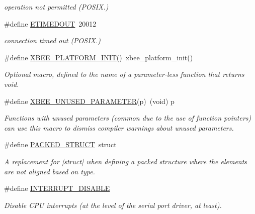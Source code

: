 \begin{DoxyCompactItemize}
\begin{DoxyCompactList}\small\item\em operation not permitted (P\+O\+S\+I\+X.) \end{DoxyCompactList}\item 
\mbox{\label{group__hal_ga597718e59a8fc9c4d4ab63f5a34e28b1}} 
\#define \hyperlink{group__hal_ga597718e59a8fc9c4d4ab63f5a34e28b1}{E\+T\+I\+M\+E\+D\+O\+UT}~20012
\begin{DoxyCompactList}\small\item\em connection timed out (P\+O\+S\+I\+X.) \end{DoxyCompactList}\end{DoxyCompactItemize}
\begin{DoxyCompactItemize}
\item 
\#define \hyperlink{group__hal_gae29ba672a9f69330a8e16a73a1a11053}{X\+B\+E\+E\+\_\+\+P\+L\+A\+T\+F\+O\+R\+M\+\_\+\+I\+N\+IT}()~xbee\+\_\+platform\+\_\+init()
\begin{DoxyCompactList}\small\item\em Optional macro, defined to the name of a parameter-\/less function that returns void. \end{DoxyCompactList}\item 
\#define \hyperlink{group__hal_gacddb73dac3fd1bdec26cd7dc0a652c00}{X\+B\+E\+E\+\_\+\+U\+N\+U\+S\+E\+D\+\_\+\+P\+A\+R\+A\+M\+E\+T\+ER}(p)~(void) p
\begin{DoxyCompactList}\small\item\em Functions with unused parameters (common due to the use of function pointers) can use this macro to dismiss compiler warnings about unused parameters. \end{DoxyCompactList}\item 
\#define \hyperlink{group__hal_ga4233297bd31be5c273d4fb0758cc54d7}{P\+A\+C\+K\+E\+D\+\_\+\+S\+T\+R\+U\+CT}~struct
\begin{DoxyCompactList}\small\item\em A replacement for \mbox{[}struct\mbox{]} when defining a packed structure where the elements are not aligned based on type. \end{DoxyCompactList}\item 
\mbox{\label{group__hal_ga658c3ad175b50000ac44b3b9ea836d1a}} 
\#define \hyperlink{group__hal_ga658c3ad175b50000ac44b3b9ea836d1a}{I\+N\+T\+E\+R\+R\+U\+P\+T\+\_\+\+D\+I\+S\+A\+B\+LE}
\begin{DoxyCompactList}\small\item\em Disable C\+PU interrupts (at the level of the serial port driver, at least). \end{DoxyCompactList}\item 

\end{DoxyCompactItemize}
